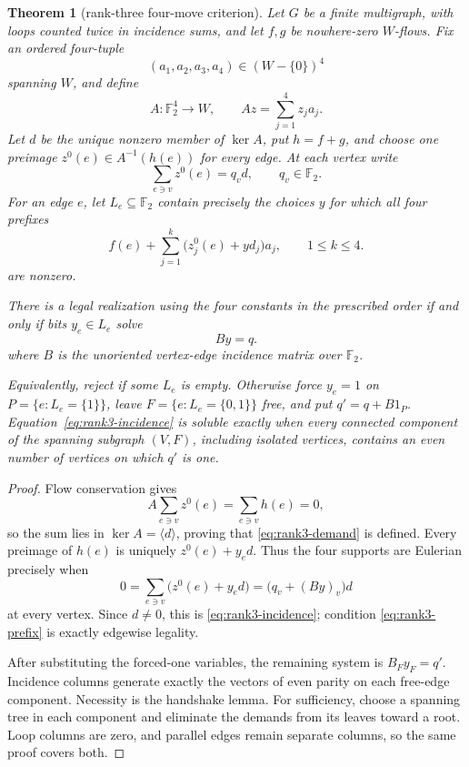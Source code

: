 \documentclass[11pt]{article}
\newtheorem{theorem}{Theorem}[section]
\theoremstyle{definition}
\theoremstyle{remark}
\newcommand{\F}{\mathbb F}
\numberwithin{equation}{section}
\begin{document}
\begin{theorem}[rank-three four-move criterion]
\label{thm:rank-three-four}
Let \(G\) be a finite multigraph, with loops counted twice in incidence
sums, and let \(f,g\) be nowhere-zero \(W\)-flows.  Fix an ordered
four-tuple
\[
 (a_1,a_2,a_3,a_4)\in(W-\{0\})^4
\]
spanning \(W\), and define
\[
 A:\F_2^4\longrightarrow W,\qquad
 A z=\sum_{j=1}^4z_ja_j.
\]
Let \(d\) be the unique nonzero member of \(\ker A\), put \(h=f+g\),
and choose one preimage \(z^0(e)\in A^{-1}(h(e))\) for every edge.
At each vertex write
\begin{equation}
 \sum_{e\ni v}z^0(e)=q_vd,\qquad q_v\in\F_2.
\label{eq:rank3-demand}
\end{equation}
For an edge \(e\), let \(L_e\subseteq\F_2\) contain precisely the
choices \(y\) for which all four prefixes
\begin{equation}
 f(e)+\sum_{j=1}^k\bigl(z_j^0(e)+yd_j\bigr)a_j,
 \qquad 1\leq k\leq4.
\label{eq:rank3-prefix}
\end{equation}
are nonzero.

There is a legal realization using the four constants in the prescribed
order if and only if bits \(y_e\in L_e\) solve
\begin{equation}
                         By=q.
\label{eq:rank3-incidence}
\end{equation}
where \(B\) is the unoriented vertex-edge incidence matrix over
\(\F_2\).

Equivalently, reject if some \(L_e\) is empty.  Otherwise force
\(y_e=1\) on \(P=\{e:L_e=\{1\}\}\), leave
\(F=\{e:L_e=\{0,1\}\}\) free, and put
\(q'=q+B1_P\).  Equation~\eqref{eq:rank3-incidence} is soluble exactly when every
connected component of the spanning subgraph \((V,F)\), including
isolated vertices, contains an even number of vertices on which
\(q'\) is one.
\end{theorem}

\begin{proof}
Flow conservation gives
\[
 A\sum_{e\ni v}z^0(e)=\sum_{e\ni v}h(e)=0,
\]
so the sum lies in \(\ker A=\langle d\rangle\), proving that
\eqref{eq:rank3-demand} is defined.  Every preimage of \(h(e)\) is uniquely
\(z^0(e)+y_ed\).  Thus the four supports are Eulerian precisely when
\[
 0=\sum_{e\ni v}\bigl(z^0(e)+y_ed\bigr)
   =\bigl(q_v+(By)_v\bigr)d
\]
at every vertex.  Since \(d\ne0\), this is
\eqref{eq:rank3-incidence}; condition
\eqref{eq:rank3-prefix} is exactly edgewise legality.

After substituting the forced-one variables, the remaining system is
\(B_Fy_F=q'\).  Incidence columns generate exactly the vectors of even
parity on each free-edge component.  Necessity is the handshake lemma.
For sufficiency, choose a spanning tree in each component and eliminate
the demands from its leaves toward a root.  Loop columns are zero, and
parallel edges remain separate columns, so the same proof covers both.
\end{proof}
\end{document}
